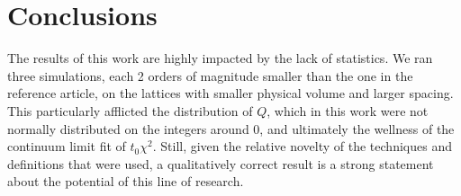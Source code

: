 \section{Conclusions}%
\label{sec:conclusions}
The results of this work are highly impacted by the lack of statistics. We ran three simulations, each 2 orders of magnitude
smaller than the one in the reference article, on the lattices with smaller physical volume and larger spacing. This particularly
afflicted the distribution of $Q$, which in this work were not normally distributed on the integers around $0$, and ultimately
the wellness of the continuum limit fit of $t_{0}\chi^{2}$.
Still, given the relative novelty of the techniques and definitions that were used, a qualitatively correct result is a strong statement
about the potential of this line of research.
